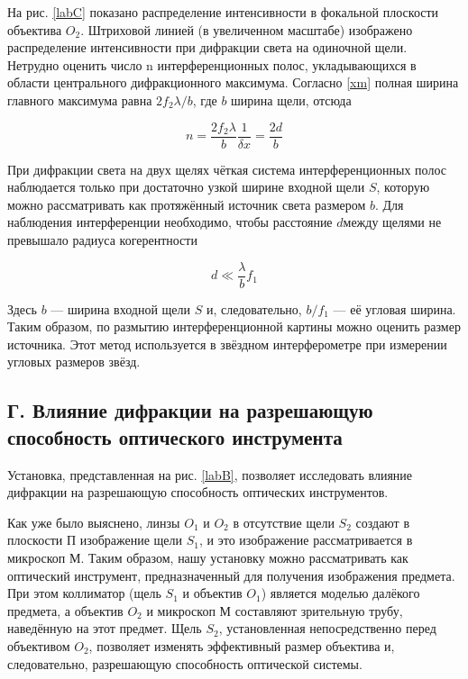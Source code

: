 \documentclass[a4paper,12pt]{article}
\begin{document}
На рис. \ref{labC} показано распределение интенсивности в фокальной плоскости объектива $ O_2 $. Штриховой линией (в увеличенном масштабе)
изображено распределение интенсивности при дифракции света на одиночной щели. Нетрудно оценить число n интерференционных полос,
укладывающихся в области центрального дифракционного максимума.
Согласно \eqref{xm} полная ширина главного максимума равна $ 2 f_2 \lambda /b $, где $ b $ ширина щели, отсюда

\begin{equation}\label{n}
n = \dfrac{2f_2 \lambda}{b} \dfrac{1}{\delta x} = \dfrac{2d}{b}
\end{equation}

При дифракции света на двух щелях чёткая система интерференционных полос наблюдается только при достаточно узкой ширине входной щели $ S $, которую можно рассматривать как протяжённый источник света размером $ b $. Для наблюдения интерференции необходимо, чтобы расстояние $ d $между щелями не превышало радиуса когерентности

\begin{equation}\label{}
d \ll \dfrac{\lambda}{b} f_1
\end{equation}

Здесь $ b $ --- ширина входной щели $ S $ и, следовательно, $  b/f_1 $ --- её угловая ширина. Таким образом, по размытию интерференционной картины можно оценить размер источника. Этот метод используется в звёздном интерферометре при измерении угловых размеров звёзд.

\subsection*{Г. Влияние дифракции на разрешающую способность оптического инструмента}

Установка, представленная на рис. \ref{labB}, позволяет исследовать влияние дифракции на разрешающую способность оптических инструментов.

Как уже было выяснено, линзы $O_1$ и $ O_2$ в отсутствие щели $S_2$ создают в плоскости П изображение щели $S_1$, и это изображение рассматривается в микроскоп М. Таким образом, нашу установку можно рассматривать как оптический инструмент, предназначенный для получения изображения предмета. При этом коллиматор (щель $S_1$ и объектив $O_1$) является моделью далёкого предмета, а объектив $O_2$ и микроскоп М составляют зрительную трубу, наведённую на этот предмет.
Щель $S_2$, установленная непосредственно перед объективом $O_2$, позволяет изменять эффективный размер объектива и, следовательно, разрешающую способность оптической системы.
\end{document}
